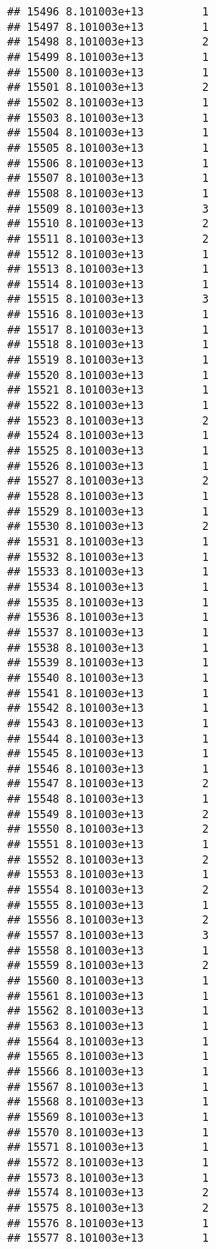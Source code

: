 \documentclass[
]{article}
\begin{document}
\begin{verbatim}
## 15496 8.101003e+13         1
## 15497 8.101003e+13         1
## 15498 8.101003e+13         2
## 15499 8.101003e+13         1
## 15500 8.101003e+13         1
## 15501 8.101003e+13         2
## 15502 8.101003e+13         1
## 15503 8.101003e+13         1
## 15504 8.101003e+13         1
## 15505 8.101003e+13         1
## 15506 8.101003e+13         1
## 15507 8.101003e+13         1
## 15508 8.101003e+13         1
## 15509 8.101003e+13         3
## 15510 8.101003e+13         2
## 15511 8.101003e+13         2
## 15512 8.101003e+13         1
## 15513 8.101003e+13         1
## 15514 8.101003e+13         1
## 15515 8.101003e+13         3
## 15516 8.101003e+13         1
## 15517 8.101003e+13         1
## 15518 8.101003e+13         1
## 15519 8.101003e+13         1
## 15520 8.101003e+13         1
## 15521 8.101003e+13         1
## 15522 8.101003e+13         1
## 15523 8.101003e+13         2
## 15524 8.101003e+13         1
## 15525 8.101003e+13         1
## 15526 8.101003e+13         1
## 15527 8.101003e+13         2
## 15528 8.101003e+13         1
## 15529 8.101003e+13         1
## 15530 8.101003e+13         2
## 15531 8.101003e+13         1
## 15532 8.101003e+13         1
## 15533 8.101003e+13         1
## 15534 8.101003e+13         1
## 15535 8.101003e+13         1
## 15536 8.101003e+13         1
## 15537 8.101003e+13         1
## 15538 8.101003e+13         1
## 15539 8.101003e+13         1
## 15540 8.101003e+13         1
## 15541 8.101003e+13         1
## 15542 8.101003e+13         1
## 15543 8.101003e+13         1
## 15544 8.101003e+13         1
## 15545 8.101003e+13         1
## 15546 8.101003e+13         1
## 15547 8.101003e+13         2
## 15548 8.101003e+13         1
## 15549 8.101003e+13         2
## 15550 8.101003e+13         2
## 15551 8.101003e+13         1
## 15552 8.101003e+13         2
## 15553 8.101003e+13         1
## 15554 8.101003e+13         2
## 15555 8.101003e+13         1
## 15556 8.101003e+13         2
## 15557 8.101003e+13         3
## 15558 8.101003e+13         1
## 15559 8.101003e+13         2
## 15560 8.101003e+13         1
## 15561 8.101003e+13         1
## 15562 8.101003e+13         1
## 15563 8.101003e+13         1
## 15564 8.101003e+13         1
## 15565 8.101003e+13         1
## 15566 8.101003e+13         1
## 15567 8.101003e+13         1
## 15568 8.101003e+13         1
## 15569 8.101003e+13         1
## 15570 8.101003e+13         1
## 15571 8.101003e+13         1
## 15572 8.101003e+13         1
## 15573 8.101003e+13         1
## 15574 8.101003e+13         2
## 15575 8.101003e+13         2
## 15576 8.101003e+13         1
## 15577 8.101003e+13         1

\end{verbatim}
\end{document}
